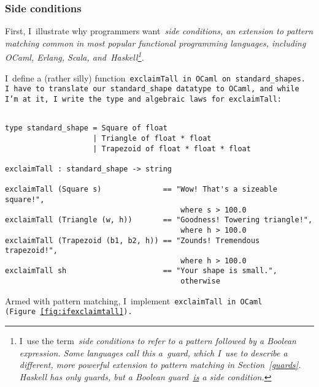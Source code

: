 \documentclass[manuscript,screen 12pt, nonacm]{acmart}
\begin{document}
\subsubsection{Side conditions}

    First, I~illustrate why programmers want~\it{side conditions}, an extension
    to pattern matching common in most popular functional programming languages,
    including OCaml, Erlang, Scala, and~Haskell\footnote{I~use the term~\it{side
    conditions} to refer to a pattern followed by a Boolean expression. Some
    languages call this a~\it{guard}, which I~use to describe a different, more
    powerful extension to pattern matching in Section~\ref{guards}. Haskell has
    \it{only} guards, but a Boolean guard~\underline{is} a side condition.}. 
    
    I~define a (rather silly) function~\tt{exclaimTall} in OCaml on
    \tt{standard\_shape}s. I~have to translate our~\tt{standard\_shape} datatype to OCaml, and
    while I'm at it, I~write the type and algebraic laws for
    \tt{exclaimTall}:

    \begin{minipage}[t]{\textwidth}        
        \centering 
        \begin{verbatim}

type standard_shape = Square of float 
                    | Triangle of float * float
                    | Trapezoid of float * float * float

exclaimTall : standard_shape -> string 

exclaimTall (Square s)              == "Wow! That's a sizeable square!", 
                                        where s > 100.0
exclaimTall (Triangle (w, h))       == "Goodness! Towering triangle!",
                                        where h > 100.0
exclaimTall (Trapezoid (b1, b2, h)) == "Zounds! Tremendous trapezoid!", 
                                        where h > 100.0
exclaimTall sh                      == "Your shape is small.", 
                                        otherwise
    \end{verbatim}
    \end{minipage}

    Armed with pattern matching, I~implement~\tt{exclaimTall} in OCaml
    (Figure~\ref{fig:ifexclaimtall}).
\end{document}
